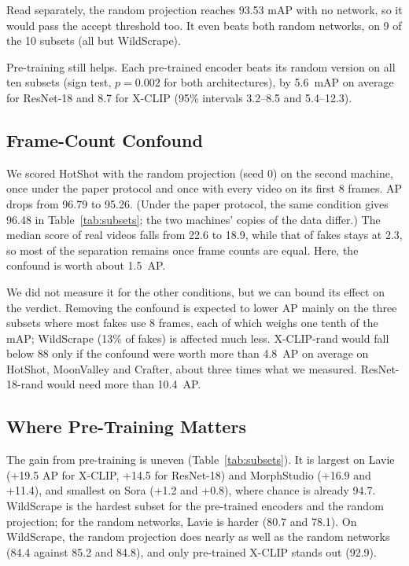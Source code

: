 \documentclass[conference]{IEEEtran}
\newif\ifdraft \draftfalse
\newcommand{\guide}[1]{\ifdraft\par\noindent{\color{gray}\small\itshape #1}\par\fi} %
\begin{document}
Read separately, the random projection reaches 93.53 mAP with no network, so
it would pass the accept threshold too. It even beats both random networks, on
9 of the 10 subsets (all but WildScrape).

Pre-training still helps. Each pre-trained encoder beats its random version on
all ten subsets (sign test, $p = 0.002$ for both architectures), by 5.6~mAP on
average for ResNet-18 and 8.7 for X-CLIP (95\% intervals 3.2--8.5 and
5.4--12.3).

\subsection{Frame-Count Confound}
\label{sec:res-confound}

We scored HotShot with the random projection (seed 0) on the second machine,
once under the paper protocol and once with every video on its first 8
frames. AP drops from 96.79 to 95.26. (Under the paper protocol, the same
condition gives 96.48 in Table~\ref{tab:subsets}; the two machines' copies of
the data differ.) The median score of real videos falls
from 22.6 to 18.9, while that of fakes stays at 2.3, so most of the separation
remains once frame counts are equal. Here, the confound is worth about
1.5~AP.

We did not measure it for the other conditions, but we can bound its effect
on the verdict. Removing the confound is expected to lower AP mainly on the
three subsets where most fakes use 8 frames, each of which weighs one tenth of
the mAP; WildScrape (13\% of fakes) is affected much less. X-CLIP-rand
would fall below 88 only if the confound were worth more than 4.8~AP on
average on HotShot, MoonValley and Crafter, about three times what we
measured. ResNet-18-rand would need more than 10.4~AP.
\guide{If the 15 runs of the 8-frame control (3 subsets, 5 conditions, seed 0)
are made, replace this paragraph with the measured drops and the corrected
mAP.}

\subsection{Where Pre-Training Matters}

The gain from pre-training is uneven (Table~\ref{tab:subsets}). It is largest
on Lavie (+19.5 AP for X-CLIP, +14.5 for ResNet-18) and MorphStudio (+16.9 and
+11.4), and smallest on Sora (+1.2 and +0.8), where chance is already 94.7.
WildScrape is the hardest subset for the pre-trained encoders and the random
projection; for the random networks, Lavie is harder (80.7 and 78.1). On
WildScrape, the random projection does nearly as well as the random networks
(84.4 against 85.2 and 84.8), and only pre-trained X-CLIP stands out (92.9).
\end{document}
